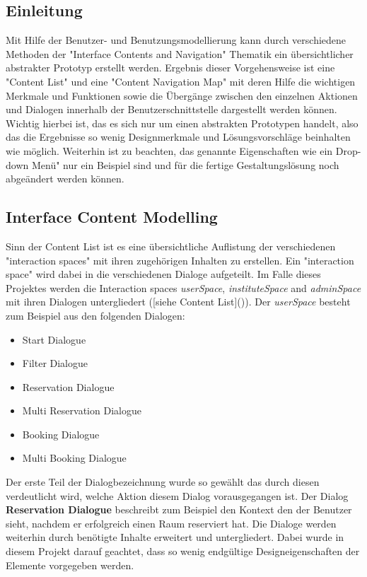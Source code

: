 \subsection{Einleitung}
\label{sec:Content Modelling Einleitung}

Mit Hilfe der Benutzer- und Benutzungsmodellierung kann durch verschiedene
Methoden der "Interface Contents and Navigation" Thematik ein übersichtlicher
abstrakter Prototyp erstellt werden. Ergebnis dieser Vorgehensweise ist
eine "Content List" und eine "Content Navigation Map" mit deren Hilfe die
wichtigen Merkmale und Funktionen sowie die Übergänge zwischen den einzelnen
Aktionen und Dialogen innerhalb der Benutzerschnittstelle dargestellt werden
können.  
Wichtig hierbei ist, das es sich nur um einen abstrakten Prototypen handelt, also
das die Ergebnisse so wenig Designmerkmale und Lösungsvorschläge beinhalten wie
möglich. Weiterhin ist zu beachten, das genannte Eigenschaften wie ein
Drop-down Menü" nur ein Beispiel sind und für die fertige Gestaltungslösung noch
abgeändert werden können.

\subsection{Interface Content Modelling}
\label{sec:Interface Content Modelling}

Sinn der Content List ist es eine übersichtliche Auflistung der verschiedenen
"interaction spaces" mit ihren zugehörigen Inhalten zu erstellen.
Ein "interaction space" wird dabei in die verschiedenen Dialoge aufgeteilt.
Im Falle dieses Projektes werden die Interaction spaces \textit{userSpace},
\textit{instituteSpace} and \textit{adminSpace} mit ihren Dialogen
untergliedert ([siehe Content List]()).  
Der \textit{userSpace} besteht zum Beispiel aus den folgenden Dialogen:

\begin{itemize}
	\item Start Dialogue
	\item Filter Dialogue
	\item Reservation Dialogue
	\item Multi Reservation Dialogue
	\item Booking Dialogue
	\item Multi Booking Dialogue
\end{itemize}

Der erste Teil der Dialogbezeichnung wurde so gewählt das durch diesen
verdeutlicht wird, welche Aktion diesem Dialog vorausgegangen ist. Der Dialog
\textbf{Reservation Dialogue} beschreibt zum Beispiel den Kontext den der Benutzer
sieht, nachdem er erfolgreich einen Raum reserviert hat.
Die Dialoge werden weiterhin durch benötigte Inhalte erweitert und untergliedert.
Dabei wurde in diesem Projekt darauf geachtet, dass so wenig endgültige
Designeigenschaften der Elemente vorgegeben werden.

